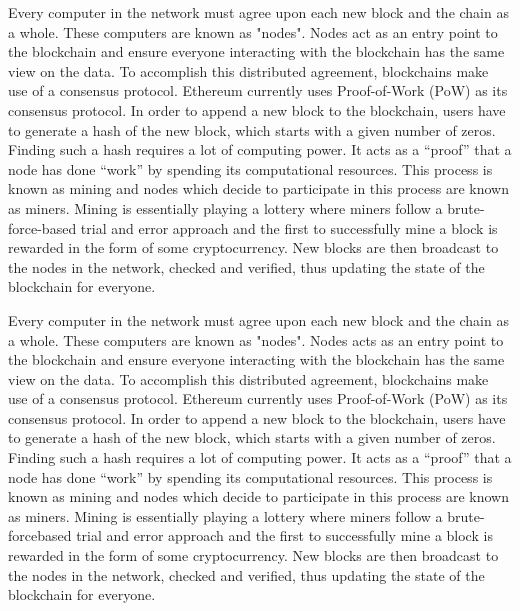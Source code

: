     Every computer in the network must agree upon each new block and the chain as a whole.
    These computers are known as "nodes".
    Nodes act as an entry point to the blockchain and ensure everyone interacting with the blockchain has the same view on the data.
    To accomplish this distributed agreement, blockchains make use of a consensus protocol.
    Ethereum currently uses Proof-of-Work (PoW) as its consensus protocol.
    In order to append a new block to the blockchain, users have to generate a hash of the new block, which starts with a given number of zeros.
    Finding such a hash requires a lot of computing power.
    It acts as a “proof” that a node has done “work” by spending its computational resources.
    This process is known as mining and nodes which decide to participate in this process are known as miners.
    Mining is essentially playing a lottery where miners follow a brute-force-based trial and error approach and the first to successfully mine a block is rewarded in the form of some cryptocurrency.
    New blocks are then broadcast to the nodes in the network, checked and verified, thus updating the state of the blockchain for everyone.

    Every computer in the network must agree upon each new block and the chain as a whole.
    These computers are known as "nodes".
    Nodes acts as an entry point to the blockchain and ensure everyone interacting with the blockchain has the same view on the data.
    To accomplish this distributed agreement, blockchains make use of a consensus protocol.
    Ethereum currently uses Proof-of-Work (PoW) as its consensus protocol.
    In order to append a new block to the blockchain, users have to generate a hash of the new block, which starts with a given number of zeros.
    Finding such a hash requires a lot of computing power.
    It acts as a “proof” that a node has done “work” by spending its computational resources.
    This process is known as mining and nodes which decide to participate in this process are known as miners.
    Mining is essentially playing a lottery where miners follow a brute-forcebased trial and error approach and the first to successfully mine a block is rewarded in the form of some cryptocurrency.
    New blocks are then broadcast to the nodes in the network, checked and verified, thus updating the state of the blockchain for everyone.

